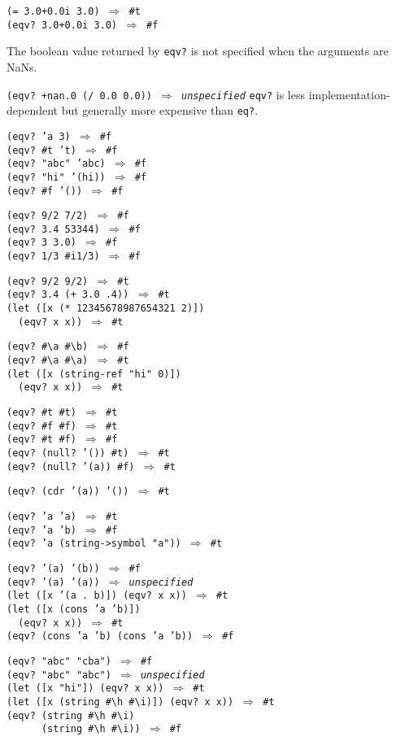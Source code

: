 \begin{alltt}
(= 3.0+0.0i 3.0) \(\Rightarrow\) \#{}t
(eqv? 3.0+0.0i 3.0) \(\Rightarrow\) \#{}f
\end{alltt}


The boolean value returned by \texttt{eqv?} is not specified when the
arguments are NaNs.


\texttt{(eqv? +nan.0 (/ 0.0 0.0)) \(\Rightarrow\) \textit{unspecified}}
\texttt{eqv?} is less implementation-dependent but generally more
expensive than \texttt{eq?}.

\begin{alltt}
(eqv? 'a 3) \(\Rightarrow\) \#{}f
(eqv? \#{}t 't) \(\Rightarrow\) \#{}f
(eqv? "abc" 'abc) \(\Rightarrow\) \#{}f
(eqv? "hi" '(hi)) \(\Rightarrow\) \#{}f
(eqv? \#{}f '()) \(\Rightarrow\) \#{}f

(eqv? 9/2 7/2) \(\Rightarrow\) \#{}f
(eqv? 3.4 53344) \(\Rightarrow\) \#{}f
(eqv? 3 3.0) \(\Rightarrow\) \#{}f
(eqv? 1/3 \#{}i1/3) \(\Rightarrow\) \#{}f

(eqv? 9/2 9/2) \(\Rightarrow\) \#{}t
(eqv? 3.4 (+ 3.0 .4)) \(\Rightarrow\) \#{}t
(let ([x (* 12345678987654321 2)])
  (eqv? x x)) \(\Rightarrow\) \#{}t

(eqv? \#{}\textbackslash{}a \#{}\textbackslash{}b) \(\Rightarrow\) \#{}f
(eqv? \#{}\textbackslash{}a \#{}\textbackslash{}a) \(\Rightarrow\) \#{}t
(let ([x (string-ref "hi" 0)])
  (eqv? x x)) \(\Rightarrow\) \#{}t

(eqv? \#{}t \#{}t) \(\Rightarrow\) \#{}t
(eqv? \#{}f \#{}f) \(\Rightarrow\) \#{}t
(eqv? \#{}t \#{}f) \(\Rightarrow\) \#{}f
(eqv? (null? '()) \#{}t) \(\Rightarrow\) \#{}t
(eqv? (null? '(a)) \#{}f) \(\Rightarrow\) \#{}t

(eqv? (cdr '(a)) '()) \(\Rightarrow\) \#{}t

(eqv? 'a 'a) \(\Rightarrow\) \#{}t
(eqv? 'a 'b) \(\Rightarrow\) \#{}f
(eqv? 'a (string-\textgreater{}symbol "a")) \(\Rightarrow\) \#{}t

(eqv? '(a) '(b)) \(\Rightarrow\) \#{}f
(eqv? '(a) '(a)) \(\Rightarrow\) \textit{unspecified}
(let ([x '(a . b)]) (eqv? x x)) \(\Rightarrow\) \#{}t
(let ([x (cons 'a 'b)])
  (eqv? x x)) \(\Rightarrow\) \#{}t
(eqv? (cons 'a 'b) (cons 'a 'b)) \(\Rightarrow\) \#{}f

(eqv? "abc" "cba") \(\Rightarrow\) \#{}f
(eqv? "abc" "abc") \(\Rightarrow\) \textit{unspecified}
(let ([x "hi"]) (eqv? x x)) \(\Rightarrow\) \#{}t
(let ([x (string \#{}\textbackslash{}h \#{}\textbackslash{}i)]) (eqv? x x)) \(\Rightarrow\) \#{}t
(eqv? (string \#{}\textbackslash{}h \#{}\textbackslash{}i)
      (string \#{}\textbackslash{}h \#{}\textbackslash{}i)) \(\Rightarrow\) \#{}f


\end{alltt}
